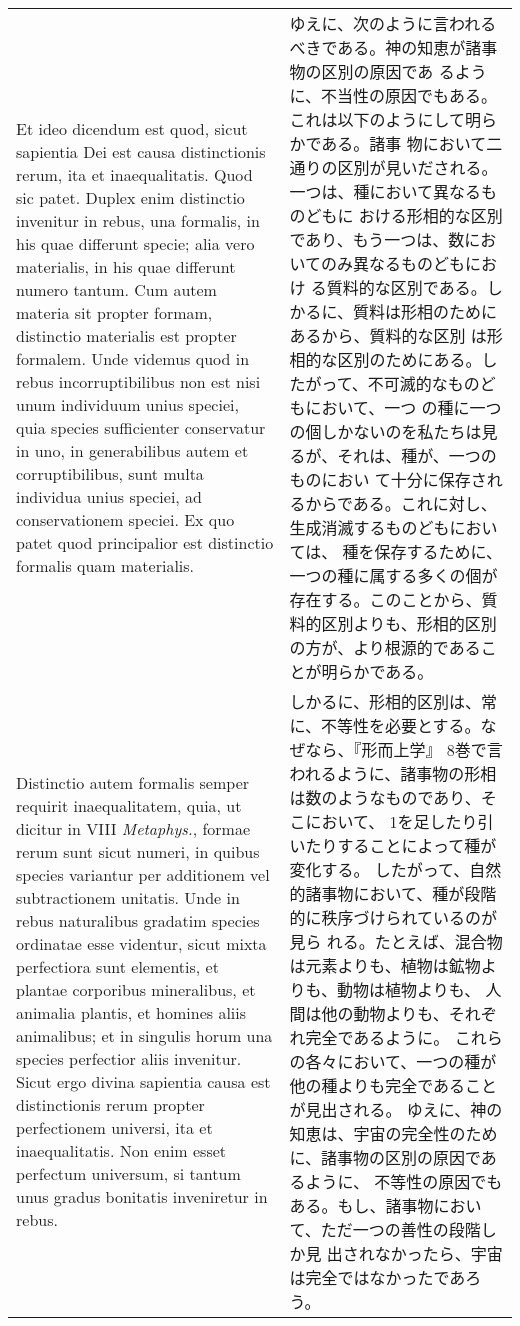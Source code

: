 \documentclass[10pt]{jsarticle} %
\begin{document}
\begin{longtable}{p{21em}p{21em}}
\\

Et ideo dicendum est quod, sicut
sapientia Dei est causa distinctionis rerum, ita et inaequalitatis. Quod
sic patet. Duplex enim distinctio invenitur in rebus, una formalis, in
his quae differunt specie; alia vero materialis, in his quae differunt
numero tantum. Cum autem materia sit propter formam, distinctio
materialis est propter formalem. Unde videmus quod in rebus
incorruptibilibus non est nisi unum individuum unius speciei, quia
species sufficienter conservatur in uno, in generabilibus autem et
corruptibilibus, sunt multa individua unius speciei, ad conservationem
speciei. Ex quo patet quod principalior est distinctio formalis quam
materialis. 

& ゆえに、次のように言われるべきである。神の知恵が諸事物の区別の原因であ
るように、不当性の原因でもある。これは以下のようにして明らかである。諸事
物において二通りの区別が見いだされる。一つは、種において異なるものどもに
おける形相的な区別であり、もう一つは、数においてのみ異なるものどもにおけ
る質料的な区別である。しかるに、質料は形相のためにあるから、質料的な区別
は形相的な区別のためにある。したがって、不可滅的なものどもにおいて、一つ
の種に一つの個しかないのを私たちは見るが、それは、種が、一つのものにおい
て十分に保存されるからである。これに対し、生成消滅するものどもにおいては、
種を保存するために、一つの種に属する多くの個が存在する。このことから、質
料的区別よりも、形相的区別の方が、より根源的であることが明らかである。


\\


Distinctio autem formalis semper requirit inaequalitatem, quia, ut
dicitur in VIII {\itshape Metaphys.}, formae rerum sunt sicut numeri, in
quibus species variantur per additionem vel subtractionem unitatis. Unde
in rebus naturalibus gradatim species ordinatae esse videntur, sicut
mixta perfectiora sunt elementis, et plantae corporibus mineralibus, et
animalia plantis, et homines aliis animalibus; et in singulis horum una
species perfectior aliis invenitur. Sicut ergo divina sapientia causa
est distinctionis rerum propter perfectionem universi, ita et
inaequalitatis. Non enim esset perfectum universum, si tantum unus
gradus bonitatis inveniretur in rebus.


&

しかるに、形相的区別は、常に、不等性を必要とする。なぜなら、『形而上学』
 8巻で言われるように、諸事物の形相は数のようなものであり、そこにおいて、
 1を足したり引いたりすることによって種が変化する。
したがって、自然的諸事物において、種が段階的に秩序づけられているのが見ら
 れる。たとえば、混合物は元素よりも、植物は鉱物よりも、動物は植物よりも、
 人間は他の動物よりも、それぞれ完全であるように。
これらの各々において、一つの種が他の種よりも完全であることが見出される。
ゆえに、神の知恵は、宇宙の完全性のために、諸事物の区別の原因であるように、
 不等性の原因でもある。もし、諸事物において、ただ一つの善性の段階しか見
 出されなかったら、宇宙は完全ではなかったであろう。


\end{longtable}
\end{document}
